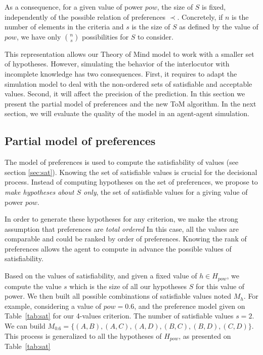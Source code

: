 \documentclass[sigconf]{aamas}  %
\begin{document}
	As a consequence, for a given value of power $pow$, the size of $S$ is fixed, independently of the possible relation of preferences $\prec$. Concretely, if $n$ is the number of elements in the criteria and $s$ is the size of $S$ as defined by the value of $pow$, we have only $\binom{n}{s}$ possibilities for $S$ to consider.
	
	This representation allows our Theory of Mind model to work with a smaller set of hypotheses. However, simulating the behavior of the interlocutor with incomplete knowledge has two consequences. First, it requires to adapt the simulation model to deal with the non-ordered sets of satisfiable and acceptable values. Second, it will affect the precision of the prediction. In this section we present the partial model of preferences and the new ToM algorithm. In the next section, we will evaluate the quality of the model in an agent-agent simulation.
	
	\subsection{Partial model of preferences}
	
	The model of preferences is used to compute the satisfiability of values (see section \ref{sec:sat}). Knowing the set of satisfiable values is crucial for the decisional process. Instead of computing hypotheses on the set of preferences, we propose to \emph{make hypotheses about $S$ only}, the set of satisfiable values for a giving value of power $pow$.  
	
	In order to generate these hypotheses for any criterion, we make the strong assumption that preferences are \emph{total ordered} In this case, all the values are comparable and could be ranked by order of preferences. Knowing the rank of preferences allows the agent to compute in advance the possible values of satisfiability.

	Based on the values of satisfiability, and given a fixed value of $h \in H_{pow}$, we compute the value $s$ which is the size of all our hypotheses $S$ for this value of power. We then built all possible combinations of satisfiable values  noted $M_h$. For example, considering a value of $pow =0.6$, and the preference model given on Table~\ref{tab:sat} for our 4-values criterion. The number of satisfiable values $s=2$. We can build $M_{0.6} = \{(A,B), (A,C), (A,D), (B,C), (B,D), (C,D)\}$. This process is generalized to all the hypotheses of $H_{pow}$, as presented on Table~\ref{tab:sat}
	
\end{document}
